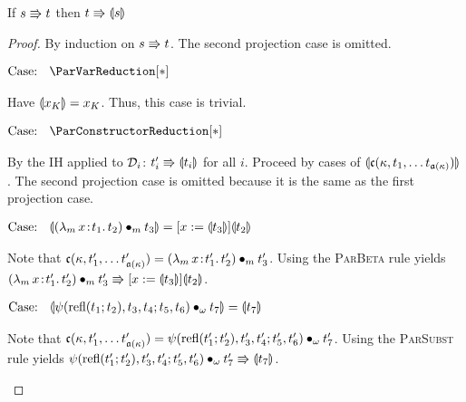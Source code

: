 \begin{lemma}
    If $s \Rrightarrow t$ then $t \Rrightarrow \llparenthesis {s} \rrparenthesis$
    \label{lem:a:par_triangle}
\end{lemma}
\begin{proof}
    By induction on $s \Rrightarrow t$.
    The second projection case is omitted.

    $\text{Case: }\begin{array}{c} \ParVarReduction[*] \end{array}$
    \begin{proofcase}
        Have $\llparenthesis {x_K} \rrparenthesis = x_K$.
        Thus, this case is trivial.
    \end{proofcase}

    $\text{Case: }\begin{array}{c} \ParConstructorReduction[*] \end{array}$
    \begin{proofcase}
        By the IH applied to $\mathcal{D}_{i}$: $t_i^\prime \Rrightarrow \llparenthesis {t_i} \rrparenthesis$ for all $i$.
        Proceed by cases of $\llparenthesis {\mathfrak{c}(\kappa, t_1, \ldots t_{\mathfrak{a}(\kappa)})} \rrparenthesis$.
        The second projection case is omitted because it is the same as the first projection case.

        $\text{Case: }\begin{array}{c} \llparenthesis {({\lambda_m}\, x\! : \! t_1.\, t_2) \bullet_{m} t_3} \rrparenthesis = [x := \llparenthesis {t_3} \rrparenthesis]\llparenthesis {t_2} \rrparenthesis \end{array}$
        \begin{proofcase}
            Note that $\mathfrak{c}(\kappa, t_1^\prime, \ldots t^\prime_{\mathfrak{a}(\kappa)}) = ({\lambda_m}\, x\! : \! t_1^\prime.\, t_2^\prime) \bullet_{m} t_3^\prime$.
            Using the \textsc{ParBeta} rule yields $({\lambda_m}\, x\! : \! t_1^\prime.\, t_2^\prime) \bullet_{m} t_3^\prime \Rrightarrow [x := \llparenthesis {t_3} \rrparenthesis]\llparenthesis {t_2} \rrparenthesis$.
        \end{proofcase}

        $\text{Case: }\begin{array}{c} \llparenthesis {\psi(\text{refl}(t_1; t_2), t_3, t_4; t_5, t_6) \bullet_{\omega} t_7} \rrparenthesis = \llparenthesis {t_7} \rrparenthesis \end{array}$
        \begin{proofcase}
            Note that $\mathfrak{c}(\kappa, t_1^\prime, \ldots t^\prime_{\mathfrak{a}(\kappa)}) = \psi(\text{refl}(t_1^\prime; t_2^\prime), t_3^\prime, t_4^\prime; t_5^\prime, t_6^\prime) \bullet_{\omega} t_7^\prime$.
            Using the \textsc{ParSubst} rule yields $\psi(\text{refl}(t_1^\prime; t_2^\prime), t_3^\prime, t_4^\prime; t_5^\prime, t_6^\prime) \bullet_{\omega} t_7^\prime \Rrightarrow \llparenthesis {t_7} \rrparenthesis$.
        \end{proofcase}


\end{proofcase}
\end{proof}

